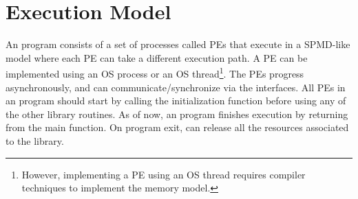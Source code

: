 \section{Execution Model}
\label{subsec:execution_model}

An \openshmem{} program consists of a set of \openshmem{} processes called \ac{PE}s that execute in a \ac{SPMD}-like model
where each \ac{PE} can take a different execution path. A \ac{PE} can be implemented using an OS process or an OS thread\footnote{However, implementing a \ac{PE} using an OS thread requires compiler techniques to implement the \openshmem{} memory model.}.
The \ac{PE}s progress asynchronously, and can communicate/synchronize 
via the \openshmem{} interfaces. All \ac{PE}s in an \openshmem{} program should start by calling
the initialization function  before using any of the other \openshmem{}
library routines. As of now, an \openshmem program finishes execution by returning from the main function. 
On program exit, \openshmem can release all the resources associated to the library. 

